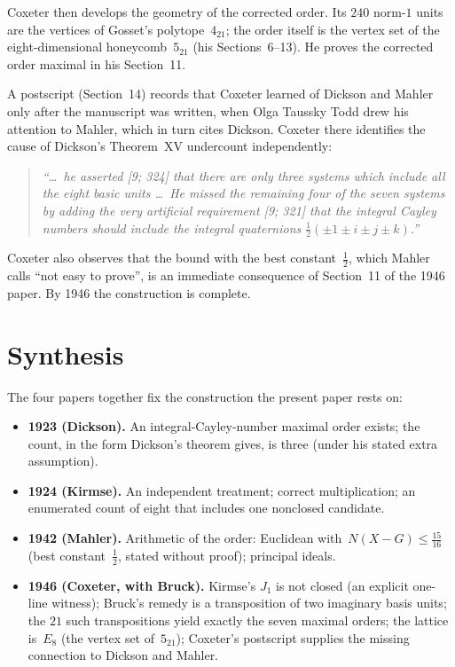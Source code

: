 \documentclass[11pt]{amsart}
\newcommand{\Nrm}{N}
\begin{document}
Coxeter then develops the geometry of the corrected order.  Its $240$
norm-$1$ units are the vertices of Gosset's polytope~$4_{21}$; the order
itself is the vertex set of the eight-dimensional honeycomb~$5_{21}$ (his
Sections~6--13).  He proves the corrected
order maximal in his Section~11.

A postscript (Section~14) records that Coxeter learned of Dickson and
Mahler only after the manuscript was written, when Olga Taussky Todd drew
his attention to Mahler, which in turn cites Dickson.  Coxeter there
identifies the cause of Dickson's Theorem~XV undercount independently:
\begin{quote}
\emph{``\ldots\ he asserted [9; 324] that there are only three systems which
include all the eight basic units \ldots\ He missed the remaining four of
the seven systems by adding the very artificial requirement [9; 321] that the
integral Cayley numbers should include the integral quaternions
$\tfrac{1}{2}(\pm 1 \pm i \pm j \pm k)$.''}
\end{quote}
Coxeter also observes that the bound with the best constant~$\tfrac12$,
which Mahler calls ``not easy to prove'', is an immediate consequence of
Section~11 of the 1946 paper.  By 1946 the construction is complete.

\section*{Synthesis}

The four papers together fix the construction the present paper rests on:

\begin{itemize}
\item \textbf{1923 (Dickson).}  An integral-Cayley-number maximal order
exists; the count, in the form Dickson's theorem
gives, is three (under his stated extra assumption).
\item \textbf{1924 (Kirmse).}  An independent treatment; correct
multiplication; an enumerated count of eight that includes one nonclosed
candidate.
\item \textbf{1942 (Mahler).}  Arithmetic of the order: Euclidean
with~$\Nrm(X-G) \le \tfrac{15}{16}$ (best constant~$\tfrac12$, stated
without proof); principal ideals.
\item \textbf{1946 (Coxeter, with Bruck).}  Kirmse's $J_1$ is not closed
(an explicit one-line witness); Bruck's remedy is a transposition of two
imaginary basis units; the $21$ such transpositions yield exactly the seven
maximal orders; the lattice is~$E_8$ (the vertex set of~$5_{21}$);
Coxeter's postscript supplies the missing connection to
Dickson and Mahler.
\end{itemize}
\end{document}
